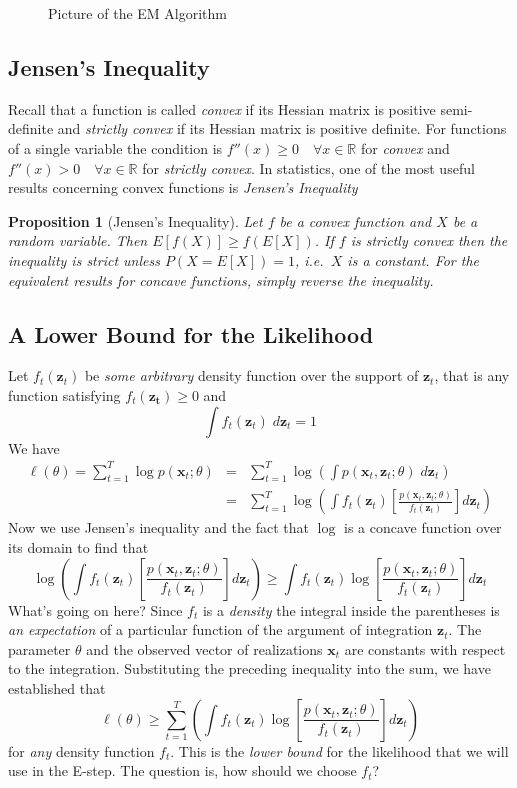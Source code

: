 \documentclass[12pt]{article}
\newtheorem{pro}{Proposition}[section]
\theoremstyle{definition}
\begin{document}
\begin{figure}
	\centering
	\caption{Picture of the EM Algorithm}
\end{figure}

\subsection{Jensen's Inequality}
Recall that a function is called \emph{convex} if its Hessian matrix is positive semi-definite and \emph{strictly convex} if its Hessian matrix is positive definite. For functions of a single variable the condition is $f''(x)\geq 0 \quad \forall x\in\mathbb{R}$ for \emph{convex} and $f''(x)> 0 \quad \forall x\in\mathbb{R}$ for \emph{strictly convex}. In statistics, one of the most useful results concerning convex functions is \emph{Jensen's Inequality}
\begin{pro}[Jensen's Inequality]
 	Let $f$ be a convex function and $X$ be a random variable. Then $E[f(X)]\geq f(E[X])$. If $f$ is strictly convex then the inequality is strict unless $P(X = E[X]) = 1$, i.e.\ $X$ is a constant. For the equivalent results for concave functions, simply reverse the inequality.
 \end{pro} 



\subsection{A Lower Bound for the Likelihood}
Let $f_t(\mathbf{z}_t)$ be \emph{some arbitrary} density function over the support of $\mathbf{z}_t$, that is any function satisfying $f_t(\mathbf{z_t})\geq 0$ and
	$$\int f_t(\textbf{z}_t) \;d \textbf{z}_t = 1$$
We have
	\begin{eqnarray*}
		 \ell(\theta) = \sum_{t=1}^T \log p(\textbf{x}_t;\theta) &=& \sum_{t=1}^T \log \left(\int p(\textbf{x}_t,	\textbf{z}_t;\theta)\; d \textbf{z}_t \right)\\
		 	&=&  \sum_{t=1}^T \log \left(\int f_t(\mathbf{z}_t) \left[\frac{p(\textbf{x}_t,	\textbf{z}_t;\theta)}{f_t(\mathbf{z}_t)}\right] d \textbf{z}_t \right)
	\end{eqnarray*}
Now we use Jensen's inequality and the fact that $\log$ is a concave function over its domain to find that
	$$\log \left(\int f_t(\mathbf{z}_t) \left[\frac{p(\textbf{x}_t,	\textbf{z}_t;\theta)}{f_t(\mathbf{z}_t)}\right] d \textbf{z}_t \right) \geq \int f_t(\mathbf{z}_t) \log\left[\frac{p(\textbf{x}_t,\textbf{z}_t;\theta)}{f_t(\mathbf{z}_t)}\right] d \textbf{z}_t $$
What's going on here? Since $f_t$ is a \emph{density} the integral inside the parentheses is \emph{an expectation} of a particular function of the argument of integration $\mathbf{z}_t$. The parameter $\theta$ and the observed vector of realizations $\mathbf{x}_t$ are constants with respect to the integration. Substituting the preceding inequality into the sum, we have established that
	$$\ell(\theta) \geq \sum_{t=1}^T \left(\int f_t(\mathbf{z}_t) \log\left[\frac{p(\textbf{x}_t,\textbf{z}_t;\theta)}{f_t(\mathbf{z}_t)}\right] d \textbf{z}_t \right)$$
for \emph{any} density function $f_t$. This is the \emph{lower bound} for the likelihood that we will use in the E-step. The question is, how should we choose $f_t$? 
\end{document}
